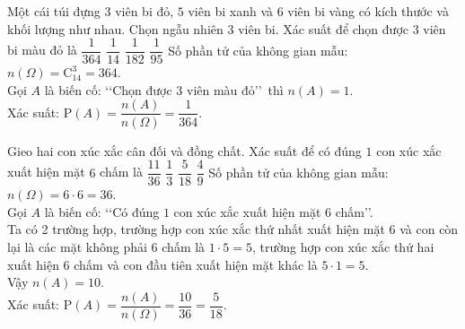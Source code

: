 \begin{ex}%
	Một cái túi đựng $3$ viên bi đỏ, $5$ viên bi xanh và $6$ viên bi vàng có kích thước và khối lượng như nhau. Chọn ngẫu nhiên $3$ viên bi. Xác suất để chọn được $3$ viên bi màu đỏ là
	\choice
	{\True $\dfrac{1}{364}$}
	{$\dfrac{1}{14}$}
	{$\dfrac{1}{182}$}
	{$\dfrac{1}{95}$}
	\loigiai
	{
		Số phần tử của không gian mẫu: $n(\Omega)=\mathrm{C}^3_{14}=364$.\\
		Gọi $A$ là biến cố: \lq\lq  Chọn được $3$ viên màu đỏ\rq\rq \, thì $n(A)=1$.\\
		Xác suất: $\mathrm{P}(A)=\dfrac{n(A)}{n(\Omega)} =\dfrac{1}{364}$.	
	}	
\end{ex}
\begin{ex}%
	Gieo hai con xúc xắc cân đối và đồng chất. Xác suất để có đúng $1$ con xúc xắc xuất hiện mặt $6$ chấm là
	\choice
	{$\dfrac{11}{36}$}
	{$\dfrac{1}{3}$}
	{\True $\dfrac{5}{18}$}
	{$\dfrac{4}{9}$}
	\loigiai
	{
		Số phần tử của không gian mẫu: $n(\Omega)=6\cdot 6=36$.\\
		Gọi $A$ là biến cố: \lq\lq  Có đúng $1$ con xúc xắc xuất hiện mặt $6$ chấm\rq\rq .\\
		Ta có 2 trường hợp, trường hợp con xúc xắc thứ nhất xuất hiện mặt 6 và con còn lại là các mặt không phải 6 chấm là $ 1 \cdot 5 =5 $, trường hợp con xúc xắc thứ hai xuất hiện 6 chấm và con đầu tiên xuất hiện mặt khác là $ 5 \cdot 1 = 5 $.\\
		Vậy $n(A)=10$.\\
		Xác suất: $\mathrm{P}(A)=\dfrac{n(A)}{n(\Omega)} =\dfrac{10}{36}=\dfrac{5}{18}$.	
	}	
\end{ex}
